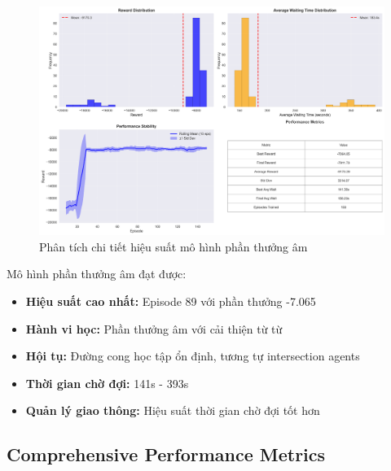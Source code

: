 \begin{figure}[!htp]
    \centering
    \includegraphics[width=\textwidth]{figures/sync_negative_model_summary.png}
    \caption{Phân tích chi tiết hiệu suất mô hình phần thưởng âm}
    \label{fig:sync_negative_model_summary}
\end{figure}

Mô hình phần thưởng âm đạt được:
\begin{itemize}
    \item \textbf{Hiệu suất cao nhất:} Episode 89 với phần thưởng -7.065

    \item \textbf{Hành vi học:} Phần thưởng âm với cải thiện từ từ

    \item \textbf{Hội tụ:} Đường cong học tập ổn định, tương tự intersection agents

    \item \textbf{Thời gian chờ đợi:} 141s - 393s

    \item \textbf{Quản lý giao thông:} Hiệu suất thời gian chờ đợi tốt hơn
\end{itemize}

\subsection{Comprehensive Performance Metrics}

